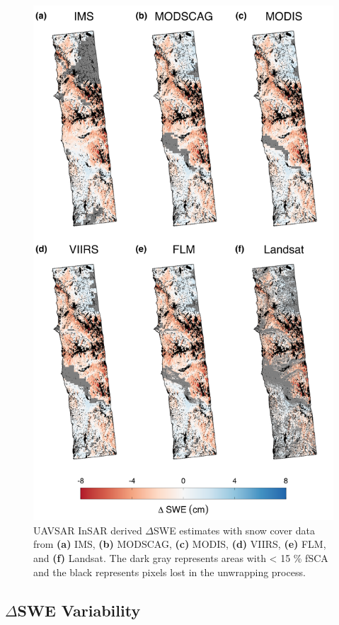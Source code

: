 \clearpage
\begin{figure}[t]
\centering
\includegraphics[width=\textwidth]{figures/ch4_figs/dswe_uavsar_v2.png}
\centering
\caption{UAVSAR InSAR derived $\Delta$SWE estimates with snow cover data from \textbf{(a)} IMS, \textbf{(b)} MODSCAG, \textbf{(c)} MODIS, \textbf{(d)} VIIRS, \textbf{(e)} FLM, and \textbf{(f)} Landsat. The dark gray represents areas with < 15 \% fSCA and the black represents pixels lost in the unwrapping process.}
\end{figure}

\hypertarget{ch4-results}{\subsection{$\Delta$SWE Variability}\label{ch4-results}}

